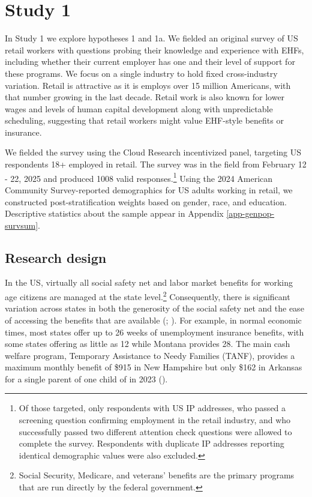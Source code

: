 \documentclass[
  11pt,
  oneside]{article}
\begin{document}
\section{Study 1}\label{sec-genpop}

In Study 1 we explore hypotheses 1 and 1a. We fielded an original survey of US retail workers with questions probing their knowledge and experience with EHFs, including whether their current employer has one and their level of support for these programs. We focus on a single industry to hold fixed cross-industry variation. Retail is attractive as it is employs over 15 million Americans, with that number growing in the last decade. Retail work is also known for lower wages and levels of human capital development along with unpredictable scheduling, suggesting that retail workers might value EHF-style benefits or insurance.

We fielded the survey using the Cloud Research incentivized panel, targeting US respondents 18+ employed in retail. The survey was in the field from February 12 - 22, 2025 and produced 1008 valid responses.\footnote{Of those targeted, only respondents with US IP addresses, who passed a screening question confirming employment in the retail industry, and who successfully passed two different attention check questions were allowed to complete the survey. Respondents with duplicate IP addresses reporting identical demographic values were also excluded.} Using the 2024 American Community Survey-reported demographics for US adults working in retail, we constructed post-stratification weights based on gender, race, and education. Descriptive statistics about the sample appear in Appendix \ref{app-genpop-survsum}.

\subsection{Research design}\label{research-design}

In the US, virtually all social safety net and labor market benefits for working age citizens are managed at the state level.\footnote{Social Security, Medicare, and veterans' benefits are the primary programs that are run directly by the federal government.} Consequently, there is significant variation across states in both the generosity of the social safety net and the ease of accessing the benefits that are available (; ). For example, in normal economic times, most states offer up to 26 weeks of unemployment insurance benefits, with some states offering as little as 12 while Montana provides 28. The main cash welfare program, Temporary Assistance to Needy Families (TANF), provides a maximum monthly benefit of \$915 in New Hampshire but only \$162 in Arkansas for a single parent of one child of in 2023 ().
\end{document}
